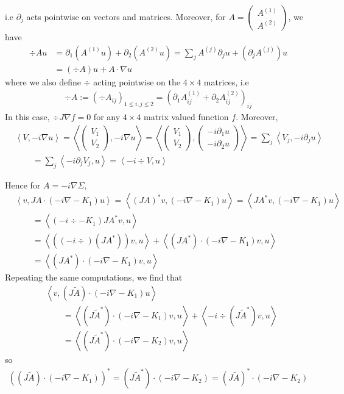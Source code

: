 \documentclass[11pt,a4paper,reqno,french,tikz]{amsart}
\newcommand{\pa}[1]{\left( #1 \right)} %
\newcommand{\ps}[1]{\left< #1 \right>} %
\newcommand{\na}{\nabla} %
\newcommand{\mat}[1]{\begin{pmatrix} #1 \end{pmatrix}} %
\begin{document}
i.e $\partial_j$ acts pointwise on vectors and matrices. Moreover, for $A = \mat{A^{(1)} \\ A^{(2)}}$, we have
\begin{align*}
	\div A u & = \partial_1 \pa{A^{(1)} u} + \partial_2 \pa{A^{(2)} u} = \sum_j A^{(j)} \partial_j u + \pa{\partial_j A^{(j)}}u  \\
& = \pa{\div A}u  + A \cdot \na u
\end{align*}
where we also define $\div$ acting pointwise on the $4\times 4$ matrices, i.e
\begin{align*}
\div A := \pa{\div A_{ij}}_{1 \le i,j \le 2} = \pa{\partial_1 A^{(1)}_{ij} + \partial_2 A^{(2)}_{ij}}_{ij}
\end{align*}
In this case, $\div J \na f = 0$ for any $4 \times 4$ matrix valued function $f$. Moreover,
\begin{align*}
	& \ps{V, -i\na u} = \ps{\mat{V_1 \\ V_2}, -i\na u} = \ps{\mat{V_1 \\ V_2}, \mat{-i\partial_1 u \\ -i\partial_2 u}} =\sum_j  \ps{V_j,-i\partial_j u} \\
&\qquad = \sum_j \ps{-i\partial_j V_j,u} = \ps{-i\div V, u}
\end{align*}

Hence for $A = -i\na \Sigma$,
\begin{align*}
	&\ps{v, JA \cdot \pa{-i\na -K_1} u} = \ps{\pa{JA}^* v, \pa{-i\na -K_1}u} = \ps{JA^* v, \pa{-i\na -K_1}u} \\
	& \qquad =  \ps{\pa{-i\div -K_1}JA^* v, u} \\
	& \qquad = \ps{ \pa{\pa{-i\div }\pa{JA^*}}v , u} + \ps{(JA^*) \cdot \pa{-i\na -K_1}v , u} \\
	& \qquad = \ps{(JA^*) \cdot\pa{-i\na -K_1}v , u}
\end{align*}
Repeating the same computations, we find that
\begin{align*}
& \ps{v, \pa{J \widetilde{A}} \cdot \pa{-i\na -K_1} u} \\
& \qquad = \ps{\pa{J \widetilde{A}^*} \cdot \pa{-i\na -K_1} v,u} + \ps{-i\div \pa{J \widetilde{A}^*} v,u} \\
& \qquad = \ps{\pa{J \widetilde{A}^*} \cdot \pa{-i\na -K_2} v,u}
\end{align*}
so 
\begin{align*}
\pa{\pa{J \widetilde{A}} \cdot \pa{-i\na -K_1}}^* = \pa{J \widetilde{A}^*} \cdot \pa{-i\na -K_2} = \pa{J \widetilde{A}}^* \cdot \pa{-i\na -K_2}
\end{align*}
\end{document}
